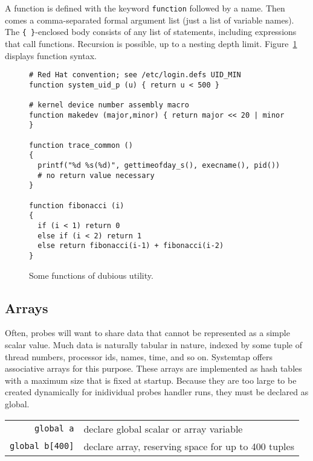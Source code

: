 \documentclass{article}
\newenvironment{boxedminipage}%
    {\begin{makeimage}\begin{center}\begin{Sbox}\begin{minipage}}%
    {\end{minipage}\end{Sbox}\fbox{\TheSbox}\end{center}\end{makeimage}}
\renewcommand{\nomenclature}[2]{}
\begin{document}
A function is defined with the keyword \verb+function+ followed by a
name.  Then comes a comma-separated formal argument list (just a list
of variable names).  The \verb+{ }+-enclosed body consists of any list
of statements, including expressions that call functions.  Recursion
is possible, up to a nesting depth limit.  Figure~\ref{fig:functions}
displays function syntax.


\begin{figure}[!ht]
\begin{boxedminipage}{4.5in}
\begin{verbatim}
# Red Hat convention; see /etc/login.defs UID_MIN
function system_uid_p (u) { return u < 500 }

# kernel device number assembly macro
function makedev (major,minor) { return major << 20 | minor }

function trace_common ()
{
  printf("%d %s(%d)", gettimeofday_s(), execname(), pid())
  # no return value necessary
} 

function fibonacci (i)
{
  if (i < 1) return 0
  else if (i < 2) return 1
  else return fibonacci(i-1) + fibonacci(i-2)
}
\end{verbatim}
\end{boxedminipage}
\caption{Some functions of dubious utility.}
\label{fig:functions}
\end{figure}

\subsection{Arrays}

Often, probes will want to share data that cannot be represented as a
simple scalar value.  Much data is naturally tabular in nature,
indexed by some tuple of thread numbers, processor ids, names, time,
and so on.  Systemtap offers associative arrays for this purpose.
These arrays are implemented as hash tables with a maximum size that
is fixed at startup.  Because they are too large to be created
dynamically for inidividual probes handler runs, they must be declared
as global.  \nomenclature{array}{A global
\verb+[+$k_1,k_2,\ldots,k_n\verb+]+\rightarrow value$
associative lookup table, with a string,
number for each index; the value may be a string, number, or an aggregate.}

\begin{tabular}{rl}
\verb|global a| & declare global scalar or array variable \\
\verb|global b[400]| & declare array, reserving space for up to 400 tuples \\
\end{tabular}
\end{document}

